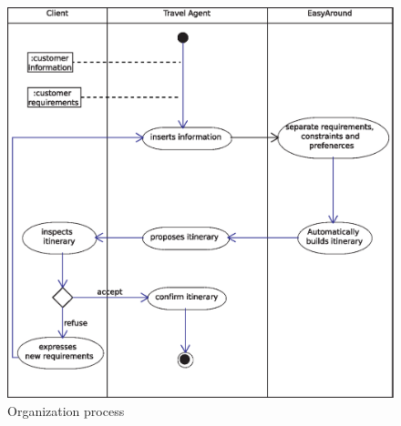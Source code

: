 \begin{figure}[h]
\centering
\includegraphics[width=\textwidth]{images/activity.eps}
\caption{Organization process}
\label{fig:orgProcess}
\end{figure}



